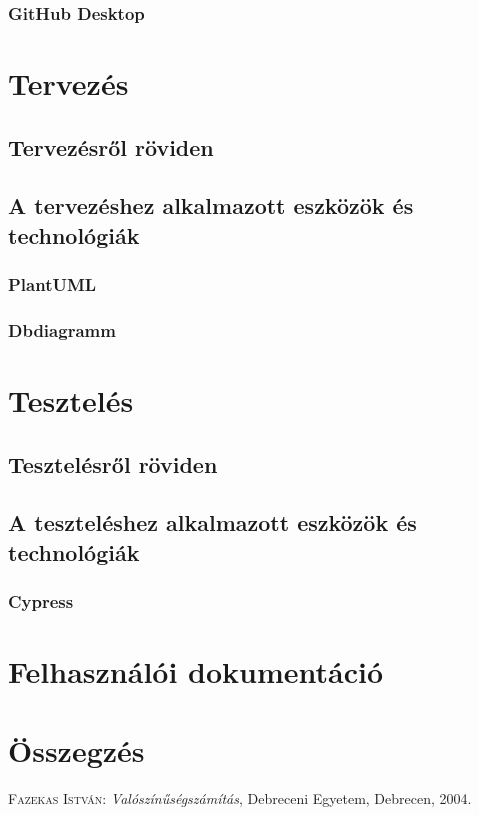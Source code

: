 \documentclass[]{thesis-ekf}
\theoremstyle{definition}
\theoremstyle{remark}
\begin{document}
	\subsection{GitHub Desktop}
	
	
	\chapter{Tervezés}
	\section{Tervezésről röviden}
	\section{A tervezéshez alkalmazott eszközök és technológiák}
	\subsection{PlantUML}
	\subsection{Dbdiagramm}
	
	\chapter{Tesztelés}
	\section{Tesztelésről röviden}
	\section{A teszteléshez alkalmazott eszközök és technológiák}
	\subsection{Cypress}
	
	\chapter{Felhasználói dokumentáció}

	
	
	\chapter*{Összegzés}
	
	\begin{thebibliography}{2}
		\textsc{Fazekas István}: \emph{Valószínűségszámítás}, Debreceni Egyetem, Debrecen, 2004.
	\end{thebibliography}
	
\end{document}

